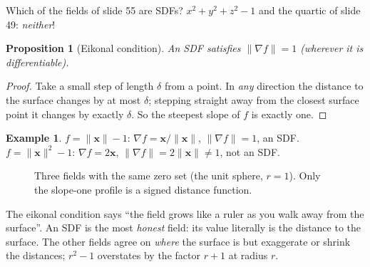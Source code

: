 \documentclass[11pt,a4paper]{article}
\newcommand{\vx}{\bm{x}}
\newcommand{\norm}[1]{\lVert #1\rVert}
\theoremstyle{definition}
\newtheorem{example}[definition]{Example}
\theoremstyle{plain}
\newtheorem{proposition}[definition]{Proposition}
\theoremstyle{remark}
\begin{document}
Which of the fields of slide 55 are SDFs? $x^2+y^2+z^2-1$ and the quartic of slide 49: \emph{neither}!

\begin{proposition}[Eikonal condition]\label{prop:eikonal}
An SDF satisfies $\norm{\nabla f}=1$ (wherever it is differentiable).
\end{proposition}
\begin{proof}
Take a small step of length $\delta$ from a point. In \emph{any} direction the distance to the surface changes by at most $\delta$; stepping straight away from the closest surface point it changes by exactly $\delta$. So the steepest slope of $f$ is exactly one.
\end{proof}

\begin{example}
$f=\norm{\vx}-1$: $\nabla f=\vx/\norm{\vx}$, $\norm{\nabla f}=1$, an SDF. $f=\norm{\vx}^2-1$: $\nabla f=2\vx$, $\norm{\nabla f}=2\norm{\vx}\ne1$, not an SDF.
\end{example}

\begin{figure}[ht]
\centering
{}
\caption{Three fields with the same zero set (the unit sphere, $r=1$). Only the slope-one profile is a signed distance function.}
\end{figure}

\begin{intuition}
The eikonal condition says ``the field grows like a ruler as you walk away from the surface''. An SDF is the most \emph{honest} field: its value literally is the distance to the surface. The other fields agree on \emph{where} the surface is but exaggerate or shrink the distances; $r^2-1$ overstates by the factor $r+1$ at radius $r$.
\end{intuition}
\end{document}
